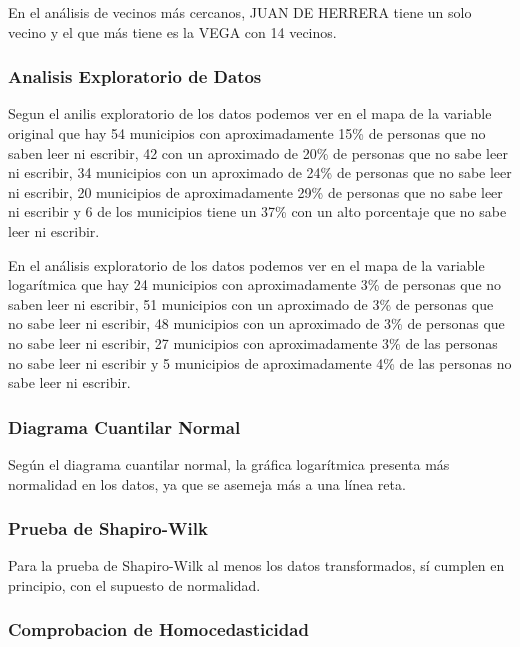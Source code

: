 \documentclass[11pt,]{article}
\begin{document}
En el análisis de vecinos más cercanos, JUAN DE HERRERA tiene un solo
vecino y el que más tiene es la VEGA con 14 vecinos.

\subsubsection{Analisis Exploratorio de
Datos}\label{analisis-exploratorio-de-datos}

Segun el anilis exploratorio de los datos podemos ver en el mapa de la
variable original que hay 54 municipios con aproximadamente 15\% de
personas que no saben leer ni escribir, 42 con un aproximado de 20\% de
personas que no sabe leer ni escribir, 34 municipios con un aproximado
de 24\% de personas que no sabe leer ni escribir, 20 municipios de
aproximadamente 29\% de personas que no sabe leer ni escribir y 6 de los
municipios tiene un 37\% con un alto porcentaje que no sabe leer ni
escribir.

En el análisis exploratorio de los datos podemos ver en el mapa de la
variable logarítmica que hay 24 municipios con aproximadamente 3\% de
personas que no saben leer ni escribir, 51 municipios con un aproximado
de 3\% de personas que no sabe leer ni escribir, 48 municipios con un
aproximado de 3\% de personas que no sabe leer ni escribir, 27
municipios con aproximadamente 3\% de las personas no sabe leer ni
escribir y 5 municipios de aproximadamente 4\% de las personas no sabe
leer ni escribir.

\subsubsection{Diagrama Cuantilar
Normal}\label{diagrama-cuantilar-normal}

Según el diagrama cuantilar normal, la gráfica logarítmica presenta más
normalidad en los datos, ya que se asemeja más a una línea reta.

\subsubsection{Prueba de Shapiro-Wilk}\label{prueba-de-shapiro-wilk}

Para la prueba de Shapiro-Wilk al menos los datos transformados, sí
cumplen en principio, con el supuesto de normalidad.

\subsubsection{Comprobacion de
Homocedasticidad}\label{comprobacion-de-homocedasticidad}
\end{document}
